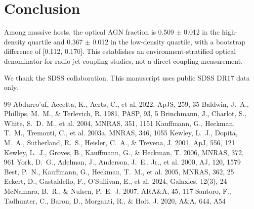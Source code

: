 \documentclass[twocolumn]{aastex631}
\begin{document}
\section{Conclusion}\label{sec:conclusion}
Among massive hosts, the optical AGN fraction is 0.509 $\pm$ 0.012 in the high-density quartile and 0.367 $\pm$ 0.012 in the low-density quartile, with a bootstrap difference of [0.112, 0.170]. This establishes an environment-stratified optical denominator for radio-jet coupling studies, not a direct coupling measurement.

\begin{acknowledgments}
We thank the SDSS collaboration. This manuscript uses public SDSS DR17 data only.
\end{acknowledgments}


\begin{thebibliography}{99}
 Abdurro'uf, Accetta, K., Aerts, C., et al. 2022, ApJS, 259, 35
 Baldwin, J.~A., Phillips, M.~M., \& Terlevich, R. 1981, PASP, 93, 5
 Brinchmann, J., Charlot, S., White, S.~D.~M., et al. 2004, MNRAS, 351, 1151
 Kauffmann, G., Heckman, T.~M., Tremonti, C., et al. 2003a, MNRAS, 346, 1055
 Kewley, L.~J., Dopita, M.~A., Sutherland, R.~S., Heisler, C.~A., \& Trevena, J. 2001, ApJ, 556, 121
 Kewley, L.~J., Groves, B., Kauffmann, G., \& Heckman, T. 2006, MNRAS, 372, 961
 York, D.~G., Adelman, J., Anderson, J.~E., Jr., et al. 2000, AJ, 120, 1579
 Best, P.~N., Kauffmann, G., Heckman, T.~M., et al. 2005, MNRAS, 362, 25
 Eckert, D., Gastaldello, F., O'Sullivan, E., et al. 2024, Galaxies, 12(3), 24
 McNamara, B.~R., \& Nulsen, P.~E.~J. 2007, ARA\&A, 45, 117
 Santoro, F., Tadhunter, C., Baron, D., Morganti, R., \& Holt, J. 2020, A\&A, 644, A54
\end{thebibliography}
\end{document}
